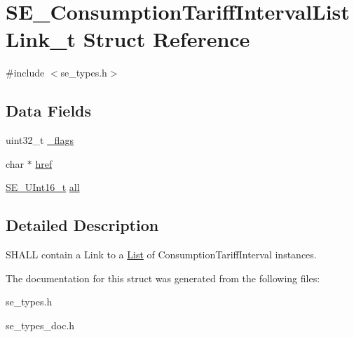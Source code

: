 \hypertarget{structSE__ConsumptionTariffIntervalListLink__t}{}\section{S\+E\+\_\+\+Consumption\+Tariff\+Interval\+List\+Link\+\_\+t Struct Reference}
\label{structSE__ConsumptionTariffIntervalListLink__t}


{\ttfamily \#include $<$se\+\_\+types.\+h$>$}

\subsection*{Data Fields}
\begin{DoxyCompactItemize}
\item 
uint32\+\_\+t \hyperlink{group__ConsumptionTariffIntervalListLink_ga5734f32544a524977e599b280236b463}{\+\_\+flags}
\item 
char $\ast$ \hyperlink{group__ConsumptionTariffIntervalListLink_ga2f84900778e99a83f0c8294ce3853f9b}{href}
\item 
\hyperlink{group__UInt16_gac68d541f189538bfd30cfaa712d20d29}{S\+E\+\_\+\+U\+Int16\+\_\+t} \hyperlink{group__ConsumptionTariffIntervalListLink_gad26eb31b13f0a99cb6ef67fa7adfc193}{all}
\end{DoxyCompactItemize}


\subsection{Detailed Description}
S\+H\+A\+LL contain a Link to a \hyperlink{structList}{List} of Consumption\+Tariff\+Interval instances. 

The documentation for this struct was generated from the following files\+:\begin{DoxyCompactItemize}
\item 
se\+\_\+types.\+h\item 
se\+\_\+types\+\_\+doc.\+h\end{DoxyCompactItemize}
